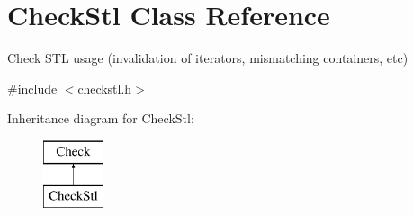 \hypertarget{class_check_stl}{\section{Check\-Stl Class Reference}
\label{class_check_stl}
}


Check S\-T\-L usage (invalidation of iterators, mismatching containers, etc)  




{\ttfamily \#include $<$checkstl.\-h$>$}

Inheritance diagram for Check\-Stl\-:\begin{figure}[H]
\begin{center}
\leavevmode
\includegraphics[height=2.000000cm]{class_check_stl}
\end{center}
\end{figure}

